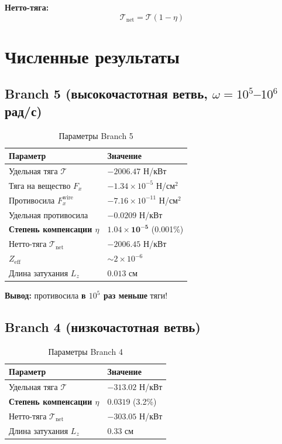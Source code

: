 \documentclass[a4paper,12pt]{article}
\begin{document}
\textbf{Нетто-тяга:}
\begin{equation}
\mathcal{T}_{\text{net}} = \mathcal{T} (1 - \eta)
\label{eq:net_thrust}
\end{equation}

\section{Численные результаты}

\subsection{Branch 5 (высокочастотная ветвь, $\omega = 10^5$--$10^6$ рад/с)}

\begin{table}[H]
\centering
\caption{Параметры Branch 5}
\label{tab:branch5}
\begin{tabular}{@{}ll@{}}
\toprule
\textbf{Параметр} & \textbf{Значение} \\
\midrule
Удельная тяга $\mathcal{T}$ & $-2006.47$ Н/кВт \\
Тяга на вещество $F_x$ & $-1.34 \times 10^{-5}$ Н/см$^2$ \\
Противосила $F_x^{\text{wire}}$ & $-7.16 \times 10^{-11}$ Н/см$^2$ \\
Удельная противосила & $-0.0209$ Н/кВт \\
\textbf{Степень компенсации $\eta$} & $\mathbf{1.04 \times 10^{-5}}$ (0.001\%) \\
Нетто-тяга $\mathcal{T}_{\text{net}}$ & $-2006.45$ Н/кВт \\
$Z_{\text{eff}}$ & $\sim 2 \times 10^{-6}$ \\
Длина затухания $L_z$ & $0.013$ см \\
\bottomrule
\end{tabular}
\end{table}

\textbf{Вывод:} противосила \textbf{в $10^5$ раз меньше} тяги!

\subsection{Branch 4 (низкочастотная ветвь)}

\begin{table}[H]
\centering
\caption{Параметры Branch 4}
\label{tab:branch4}
\begin{tabular}{@{}ll@{}}
\toprule
\textbf{Параметр} & \textbf{Значение} \\
\midrule
Удельная тяга $\mathcal{T}$ & $-313.02$ Н/кВт \\
\textbf{Степень компенсации $\eta$} & $\mathbf{0.0319}$ (3.2\%) \\
Нетто-тяга $\mathcal{T}_{\text{net}}$ & $-303.05$ Н/кВт \\
Длина затухания $L_z$ & $0.33$ см \\
\bottomrule
\end{tabular}
\end{table}
\end{document}
